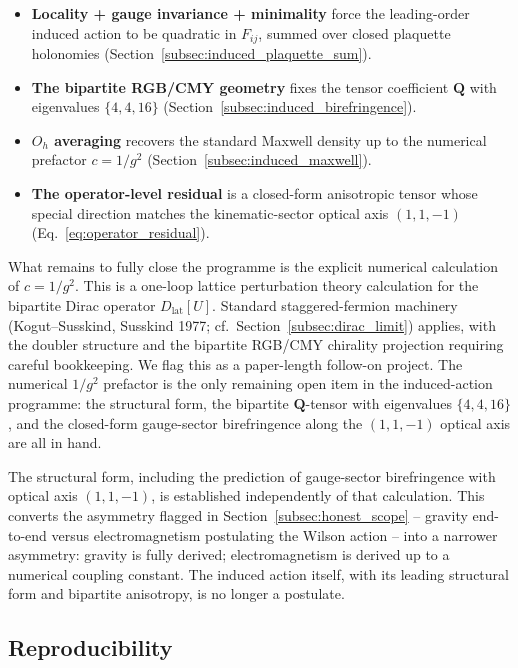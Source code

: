 \begin{itemize}
\item \textbf{Locality + gauge invariance + minimality} force the
    leading-order induced action to be quadratic in $F_{ij}$,
    summed over closed plaquette holonomies
    (Section~\ref{subsec:induced_plaquette_sum}).
\item \textbf{The bipartite RGB/CMY geometry} fixes the tensor
    coefficient $\mathbf{Q}$ with eigenvalues $\{4, 4, 16\}$
    (Section~\ref{subsec:induced_birefringence}).
\item \textbf{$O_h$ averaging} recovers the standard Maxwell density
    up to the numerical prefactor $c = 1/g^2$
    (Section~\ref{subsec:induced_maxwell}).
\item \textbf{The operator-level residual} is a closed-form
    anisotropic tensor whose special direction matches the
    kinematic-sector optical axis $(1,1,-1)$
    (Eq.~\ref{eq:operator_residual}).
\end{itemize}

What remains to fully close the programme is the explicit numerical
calculation of $c = 1/g^2$.  This is a one-loop lattice perturbation
theory calculation for the bipartite Dirac operator
$D_\text{lat}[U]$.  Standard staggered-fermion machinery
(Kogut--Susskind, Susskind 1977; cf.~Section~\ref{subsec:dirac_limit})
applies, with the doubler structure and the bipartite RGB/CMY
chirality projection requiring careful bookkeeping.  We flag this as
a paper-length follow-on project.  The numerical $1/g^2$ prefactor is
the only remaining open item in the induced-action programme: the
structural form, the bipartite $\mathbf{Q}$-tensor with eigenvalues
$\{4, 4, 16\}$, and the closed-form gauge-sector birefringence along
the $(1,1,-1)$ optical axis are all in hand.

The structural form, including the prediction of gauge-sector
birefringence with optical axis $(1,1,-1)$, is established
independently of that calculation.  This converts the asymmetry
flagged in Section~\ref{subsec:honest_scope} -- gravity end-to-end
versus electromagnetism postulating the Wilson action -- into a
narrower asymmetry: gravity is fully derived; electromagnetism is
derived up to a numerical coupling constant.  The induced action
itself, with its leading structural form and bipartite anisotropy,
is no longer a postulate.

\subsection{Reproducibility}
\label{subsec:induced_reproducibility}

